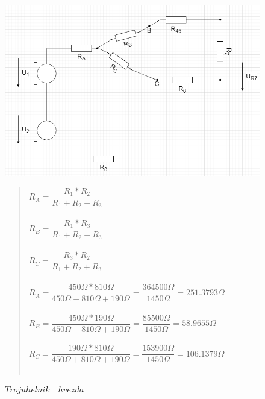 \begin{figure}[H]
    \centering
    \includegraphics[scale=0.5, keepaspectratio]{picturesFor1Uloha/2.png}
    \caption{$Trojuhelnik \quad hvezda$}
    \label{fig:Trojuhelnik_Hvezda}
    \begin{quote}
    \centering
    $R_A =  \dfrac{R_1 * R_2}{R_1 + R_2 + R_3} $  \\~\\
    $R_B =  \dfrac{R_1 * R_3}{R_1 + R_2 + R_3} $  \\~\\
    $R_C =  \dfrac{R_3 * R_2}{R_1 + R_2 + R_3} $  \\~\\
    \medskip
    $R_A =  \dfrac{450\Omega * 810\Omega}{450\Omega + 810\Omega + 190\Omega} = \dfrac{364 500\Omega}{1450\Omega} = 251.3793\Omega$ \\~\\
    $R_B =  \dfrac{450\Omega * 190\Omega}{450\Omega + 810\Omega + 190\Omega} = \dfrac{85 500\Omega}{1450\Omega} = 58.9655\Omega$ \\~\\
    $R_C =  \dfrac{190\Omega * 810\Omega}{450\Omega + 810\Omega + 190\Omega} = \dfrac{153 900\Omega}{1450\Omega} = 106.1379\Omega$ \\~\\
    \end{quote}
\end{figure}

